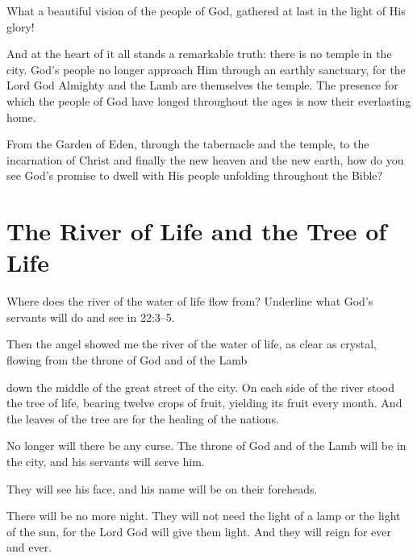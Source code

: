 What a beautiful vision of the people of God, gathered at last in the light of His glory!

And at the heart of it all stands a remarkable truth: there is no temple in the city. God's people no longer approach Him through an earthly sanctuary, for the Lord God Almighty and the Lamb are themselves the temple. The presence for which the people of God have longed throughout the ages is now their everlasting home.

\begin{ReaderQuestion}
From the Garden of Eden, through the tabernacle and the temple, to the incarnation of Christ and finally the new heaven and the new earth, how do you see God's promise to dwell with His people unfolding throughout the Bible?
\end{ReaderQuestion}

\section{The River of Life and the Tree of Life}

\begin{ScriptureBox2}{Where does the river of the water of life flow from? Underline what God's servants will do and see in 22:3--5.}

\item[22:1] Then the angel showed me the river of the water of life, as clear as crystal, flowing from the throne of God and of the Lamb

\item[22:2] down the middle of the great street of the city. On each side of the river stood the tree of life, bearing twelve crops of fruit, yielding its fruit every month. And the leaves of the tree are for the healing of the nations.

\item[22:3] No longer will there be any curse. The throne of God and of the Lamb will be in the city, and his servants will serve him.

\item[22:4] They will see his face, and his name will be on their foreheads.

\item[22:5] There will be no more night. They will not need the light of a lamp or the light of the sun, for the Lord God will give them light. And they will reign for ever and ever.

\end{ScriptureBox2}

